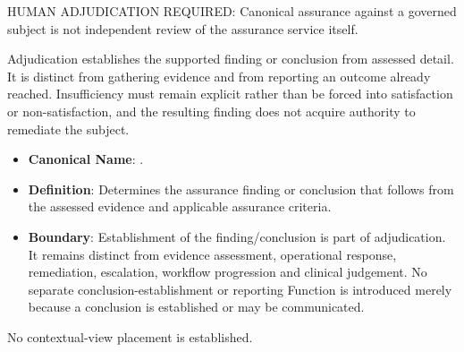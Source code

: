 HUMAN ADJUDICATION REQUIRED: Canonical assurance against a governed subject is not independent review of the assurance service itself.



Adjudication establishes the supported finding or conclusion from assessed detail. It is distinct from gathering evidence and from reporting an outcome already reached. Insufficiency must remain explicit rather than be forced into satisfaction or non-satisfaction, and the resulting finding does not acquire authority to remediate the subject.



\begin{itemize}

\item
\textbf{Canonical Name}: \texttt{}.



\item
\textbf{Definition}: Determines the assurance finding or conclusion that follows from the assessed evidence and applicable assurance criteria.



\item
\textbf{Boundary}: Establishment of the finding/\allowbreak{}conclusion is part of adjudication. It remains distinct from evidence assessment, operational response, remediation, escalation, workflow progression and clinical judgement. No separate conclusion-establishment or reporting Function is introduced merely because a conclusion is established or may be communicated.



\end{itemize}


No contextual-view placement is established.


